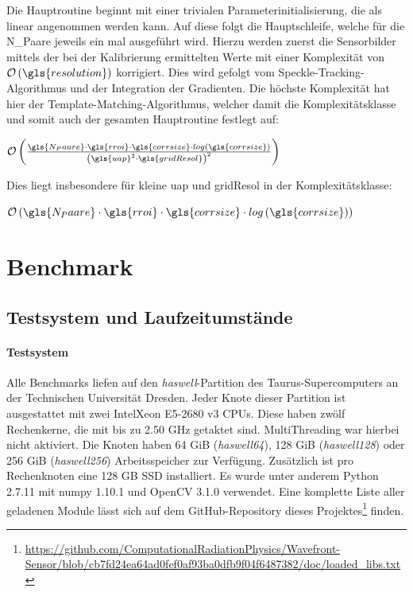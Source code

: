 Die Hauptroutine beginnt mit einer trivialen Parameterinitialisierung, die als linear angenommen werden kann. Auf diese folgt die Hauptschleife, welche für die \gls{N_Paare} jeweils ein mal ausgeführt wird. Hierzu werden zuerst die Sensorbilder mittels der bei der Kalibrierung ermittelten Werte mit einer Komplexität von $\mathcal{O}\left(\gls{resolution}\right)$ korrigiert. Dies wird gefolgt vom Speckle-Tracking-Algorithmus und der Integration der Gradienten. Die höchste Komplexität hat hier der Template-Matching-Algorithmus, welcher damit die Komplexitätsklasse und somit auch der gesamten Hauptroutine festlegt auf:

\begin{center}
	$\mathcal{O}\left(\frac{\gls{N_Paare} \cdot\gls{rroi} \cdot \gls{corrsize} \cdot log\left(\gls{corrsize}\right)}{\left(\gls{uap}^2 \cdot \gls{gridResol}\right)^2}\right)$
\end{center}

Dies liegt insbesondere für kleine \gls{uap} und \gls{gridResol} in der Komplexitätsklasse:

\begin{center}
	$\mathcal{O}\left(\gls{N_Paare} \cdot\gls{rroi} \cdot \gls{corrsize} \cdot log\left(\gls{corrsize}\right)\right)$
\end{center}

\section{Benchmark}

\subsection{Testsystem und Laufzeitumstände}

\paragraph{Testsystem}

\begin{sloppypar}
Alle Benchmarks liefen auf den \textit{haswell}-Partition des Taurus-Supercomputers an der Technischen Universität Dresden. Jeder Knote dieser Partition ist ausgestattet mit zwei Intel\textregistered \mbox{Xeon\textregistered} E5-2680 v3 \glspl{CPU}. Diese haben zwölf Rechenkerne, die mit bis zu 2.50 \gls{GHz} getaktet sind. MultiThreading war hierbei nicht aktiviert. Die Knoten haben 64 \gls{GiB} (\textit{haswell64}), 128 \gls{GiB} (\textit{haswell128}) oder 256 \gls{GiB} (\textit{haswell256}) Arbeitsspeicher zur Verfügung. Zusätzlich ist pro Rechenknoten eine 128 \gls{GB} \gls{SSD} installiert. Es wurde unter anderem Python 2.7.11 mit numpy 1.10.1 und OpenCV 3.1.0 verwendet. Eine komplette Liste aller geladenen Module lässt sich auf dem GitHub-Repository dieses Projektes\footnote{\url{https://github.com/ComputationalRadiationPhysics/Wavefront-Sensor/blob/cb7fd24ea64ad0fef0af93ba0dfb9f04f6487382/doc/loaded_libs.txt}} finden.
\end{sloppypar}

